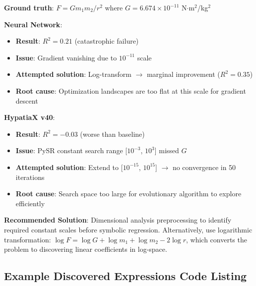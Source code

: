 \documentclass[twoside,11pt]{article}
\begin{document}
\begin{example}
\textbf{Ground truth}: $F = Gm_1m_2/r^2$ where $G = 6.674 \times 10^{-11}$ N$\cdot$m$^2$/kg$^2$

\textbf{Neural Network}:
\begin{itemize}
\item \textbf{Result}: $R^2 = 0.21$ (catastrophic failure)
\item \textbf{Issue}: Gradient vanishing due to $10^{-11}$ scale
\item \textbf{Attempted solution}: Log-transform $\to$ marginal improvement ($R^2 = 0.35$)
\item \textbf{Root cause}: Optimization landscapes are too flat at this scale for gradient descent
\end{itemize}

\textbf{HypatiaX v40}:
\begin{itemize}
\item \textbf{Result}: $R^2 = -0.03$ (worse than baseline)
\item \textbf{Issue}: PySR constant search range [$10^{-3}$, $10^3$] missed $G$
\item \textbf{Attempted solution}: Extend to [$10^{-15}$, $10^{15}$] $\to$ no convergence in 50 iterations
\item \textbf{Root cause}: Search space too large for evolutionary algorithm to explore efficiently
\end{itemize}

\textbf{Recommended Solution}: Dimensional analysis preprocessing to identify required constant scales before symbolic regression. Alternatively, use logarithmic transformation: $\log F = \log G + \log m_1 + \log m_2 - 2\log r$, which converts the problem to discovering linear coefficients in log-space\citep{la2021contemporary}.
\end{example}

\subsection{Example Discovered Expressions Code Listing}
\end{document}
